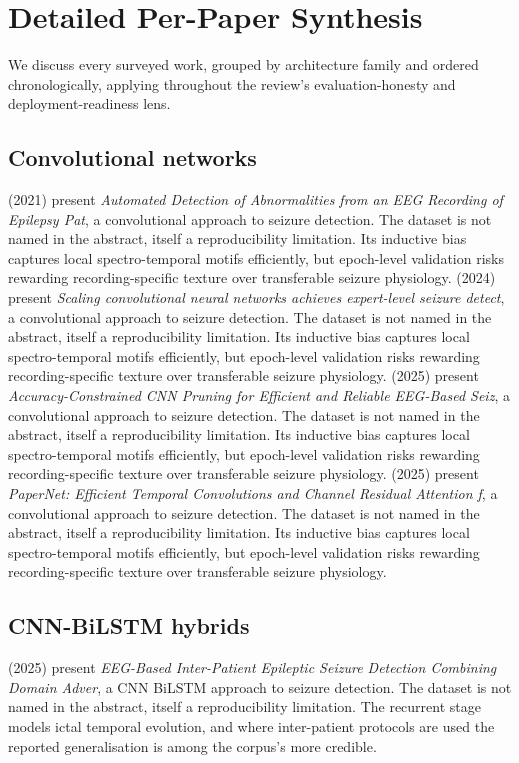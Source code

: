 \section{Detailed Per-Paper Synthesis}
We discuss every surveyed work, grouped by architecture family and ordered chronologically, applying throughout the review's evaluation-honesty and deployment-readiness lens.

\subsection{Convolutional networks}
\citet{ep210510358} (2021) present \emph{Automated Detection of Abnormalities from an EEG Recording of Epilepsy Pat}, a convolutional approach to seizure detection. The dataset is not named in the abstract, itself a reproducibility limitation. Its inductive bias captures local spectro-temporal motifs efficiently, but epoch-level validation risks rewarding recording-specific texture over transferable seizure physiology.
\citet{ep240509911} (2024) present \emph{Scaling convolutional neural networks achieves expert-level seizure detect}, a convolutional approach to seizure detection. The dataset is not named in the abstract, itself a reproducibility limitation. Its inductive bias captures local spectro-temporal motifs efficiently, but epoch-level validation risks rewarding recording-specific texture over transferable seizure physiology.
\citet{ep250905190} (2025) present \emph{Accuracy-Constrained CNN Pruning for Efficient and Reliable EEG-Based Seiz}, a convolutional approach to seizure detection. The dataset is not named in the abstract, itself a reproducibility limitation. Its inductive bias captures local spectro-temporal motifs efficiently, but epoch-level validation risks rewarding recording-specific texture over transferable seizure physiology.
\citet{ep251222172} (2025) present \emph{PaperNet: Efficient Temporal Convolutions and Channel Residual Attention f}, a convolutional approach to seizure detection. The dataset is not named in the abstract, itself a reproducibility limitation. Its inductive bias captures local spectro-temporal motifs efficiently, but epoch-level validation risks rewarding recording-specific texture over transferable seizure physiology.

\subsection{CNN-BiLSTM hybrids}
\citet{ep250515203} (2025) present \emph{EEG-Based Inter-Patient Epileptic Seizure Detection Combining Domain Adver}, a CNN BiLSTM approach to seizure detection. The dataset is not named in the abstract, itself a reproducibility limitation. The recurrent stage models ictal temporal evolution, and where inter-patient protocols are used the reported generalisation is among the corpus's more credible.

